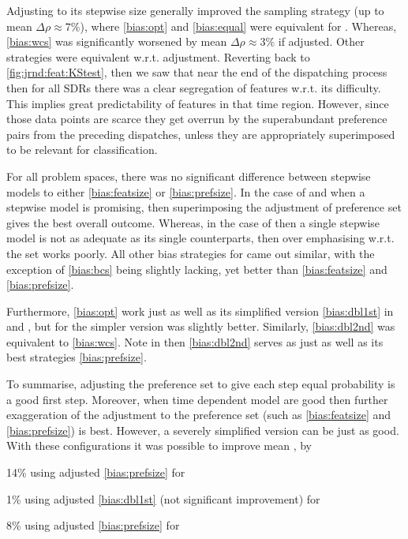 Adjusting  to its stepwise size generally improved the sampling 
strategy (up to mean $\Delta\rho\approx7\%$), where \ref{bias:opt} and 
\ref{bias:equal} were equivalent for . 
Whereas,  \ref{bias:wcs} was significantly worsened 
by mean $\Delta\rho\approx3\%$ if adjusted. Other  strategies 
were equivalent w.r.t. adjustment.
Reverting back to \cref{fig:jrnd:feat:KStest}, then we saw that near the end of 
the dispatching process then for all SDRs there was a clear segregation of 
features w.r.t. its difficulty. This implies great predictability of 
features in that time region. However, since those data points are scarce they 
get overrun by the superabundant preference pairs from the preceding 
dispatches, unless they are appropriately superimposed to be relevant for 
classification.

For all problem spaces, there was no significant difference between stepwise 
models to either \ref{bias:featsize} or \ref{bias:prefsize}. 
In the case of  and  when a stepwise model is 
promising, then superimposing the adjustment of preference set gives the 
best overall outcome. 
Whereas, in the case of  then a single stepwise model is not as 
adequate as its single counterparts, then over emphasising w.r.t. the set works 
poorly. 
All other bias strategies for  came out similar, with the 
exception of \cref{bias:bcs} being slightly lacking, yet better than 
\ref{bias:featsize} and \ref{bias:prefsize}.

Furthermore, \ref{bias:opt} work just as well as its simplified version 
\ref{bias:dbl1st} in  and , but for  
the simpler version was slightly better. 
Similarly, \ref{bias:dbl2nd} was equivalent to \ref{bias:wcs}.
Note in  then \ref{bias:dbl2nd} serves as just as well as its best 
strategies \ref{bias:prefsize}.

To summarise, adjusting the preference set to give each step equal probability 
is a good first step. 
Moreover, when time dependent model are good then further exaggeration of the  
adjustment to the preference set (such as \ref{bias:featsize} and 
\ref{bias:prefsize}) is best. 
However, a severely simplified version can be just as good. 
With these configurations it was possible to improve mean \namerho, by
\begin{enumerate*}
    \item 14\% using adjusted \ref{bias:prefsize} for 
    \item 1\% using adjusted \ref{bias:dbl1st} (not significant improvement) 
    for  
    \item 8\% using adjusted \ref{bias:prefsize} for 
\end{enumerate*}


